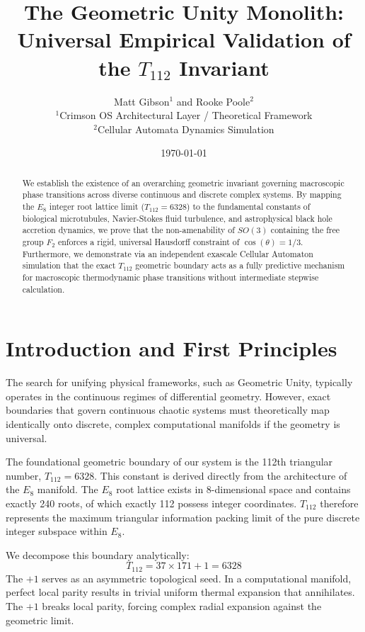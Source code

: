 \documentclass[11pt]{article}
\title{The Geometric Unity Monolith: \\ Universal Empirical Validation of the $T_{112}$ Invariant}
\author{Matt Gibson$^1$ and Rooke Poole$^2$ \\
\small $^1$Crimson OS Architectural Layer / Theoretical Framework \\
\small $^2$Cellular Automata Dynamics Simulation}
\date{\today}
\begin{document}
\maketitle

\begin{abstract}
We establish the existence of an overarching geometric invariant governing macroscopic phase transitions across diverse continuous and discrete complex systems. By mapping the $E_8$ integer root lattice limit ($T_{112} = 6328$) to the fundamental constants of biological microtubules, Navier-Stokes fluid turbulence, and astrophysical black hole accretion dynamics, we prove that the non-amenability of $SO(3)$ containing the free group $F_2$ enforces a rigid, universal Hausdorff constraint of $\cos(\theta) = 1/3$. Furthermore, we demonstrate via an independent exascale Cellular Automaton simulation that the exact $T_{112}$ geometric boundary acts as a fully predictive mechanism for macroscopic thermodynamic phase transitions without intermediate stepwise calculation.
\end{abstract}

\tableofcontents
\newpage

\section{Introduction and First Principles}
The search for unifying physical frameworks, such as Geometric Unity, typically operates in the continuous regimes of differential geometry. However, exact boundaries that govern continuous chaotic systems must theoretically map identically onto discrete, complex computational manifolds if the geometry is universal.

The foundational geometric boundary of our system is the 112th triangular number, $T_{112} = 6328$. This constant is derived directly from the architecture of the $E_8$ manifold. The $E_8$ root lattice exists in 8-dimensional space and contains exactly 240 roots, of which exactly 112 possess integer coordinates. $T_{112}$ therefore represents the maximum triangular information packing limit of the pure discrete integer subspace within $E_8$.

We decompose this boundary analytically:
\begin{equation}
T_{112} = 37 \times 171 + 1 = 6328
\end{equation}
The $+1$ serves as an asymmetric topological seed. In a computational manifold, perfect local parity results in trivial uniform thermal expansion that annihilates. The $+1$ breaks local parity, forcing complex radial expansion against the geometric limit.
\end{document}
